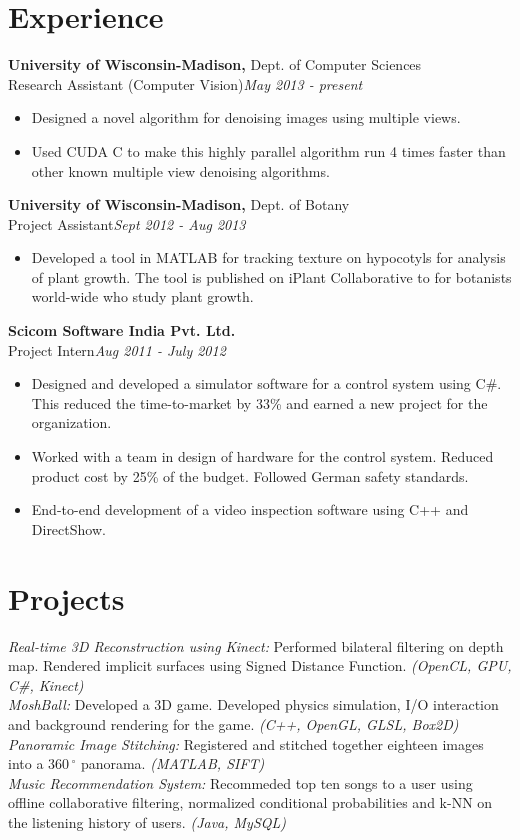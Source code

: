 \documentclass[margin]{res}
\begin{document}
\begin{resume}
\section{Experience}
 {\bf University of Wisconsin-Madison,} Dept. of Computer Sciences \\
Research Assistant (Computer Vision)\hfill {\it May 2013 - present}
 \begin{itemize} \itemsep -2pt  %
 \item Designed a novel algorithm for denoising images using multiple views.
 \item Used CUDA C to make this highly parallel algorithm run 4 times faster than other known multiple view denoising algorithms. 
 \end{itemize}

  {\bf University of Wisconsin-Madison,} Dept. of Botany \\
Project Assistant\hfill {\it Sept 2012 - Aug 2013}
 \begin{itemize} \itemsep -2pt  %
 \item Developed a tool in MATLAB for tracking texture on hypocotyls for analysis of plant growth. The tool is published on iPlant Collaborative to for botanists world-wide who study plant growth.
 \end{itemize}
  {\bf Scicom Software India Pvt. Ltd.} \\
Project Intern\hfill{\it Aug 2011 - July 2012}
 \begin{itemize} \itemsep -2pt  %
 \item Designed and developed a simulator software for a control system using C\#. This reduced the time-to-market by 33\% and earned a new project for the organization.
 \item Worked with a team in design of hardware for the control system. Reduced product cost by 25\% of the budget. Followed German safety standards. 
 \item End-to-end development of a video inspection software using C++ and DirectShow.
 \end{itemize}
\section{Projects}
{\it Real-time 3D Reconstruction using Kinect:} Performed bilateral filtering on depth map. Rendered implicit surfaces using Signed Distance Function. {\it(OpenCL, GPU, C\#, Kinect)}
\\{\it MoshBall:} Developed a 3D game. Developed physics simulation, I/O interaction and background rendering for the game. {\it (C++, OpenGL, GLSL, Box2D)}  
\\{\it Panoramic Image Stitching:} Registered and stitched together eighteen images into a $360\,^{\circ}$ panorama. {\it (MATLAB, SIFT)}
\\{\it Music Recommendation System:} Recommeded top ten songs to a user using offline collaborative filtering, normalized conditional probabilities and k-NN on the listening history of users. {\it (Java, MySQL)}


\end{resume}
\end{document}
